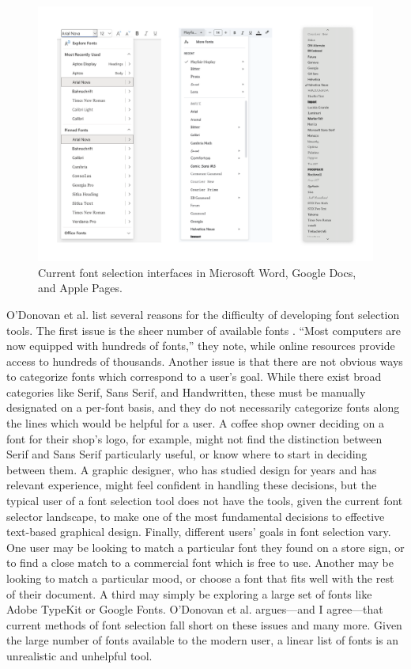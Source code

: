\begin{figure}[h]
    \centering
    \includegraphics[width=1\textwidth]{images/font-selectors.png}
    \caption{Current font selection interfaces in Microsoft Word, Google Docs, and Apple Pages.}
    \label{fig:font-selectors}
\end{figure}

O'Donovan et al. list several reasons for the difficulty of developing font selection tools. The first issue is the sheer number of available fonts \cite{odonovan2014}. ``Most computers are now equipped with hundreds of fonts,'' they note, while online resources provide access to hundreds of thousands. Another issue is that there are not obvious ways to categorize fonts which correspond to a user's goal. While there exist broad categories like Serif, Sans Serif, and Handwritten, these must be manually designated on a per-font basis, and they do not necessarily categorize fonts along the lines which would be helpful for a user. A coffee shop owner deciding on a font for their shop's logo, for example, might not find the distinction between Serif and Sans Serif particularly useful, or know where to start in deciding between them. A graphic designer, who has studied design for years and has relevant experience, might feel confident in handling these decisions, but the typical user of a font selection tool does not have the tools, given the current font selector landscape, to make one of the most fundamental decisions to effective text-based graphical design. Finally, different users' goals in font selection vary. One user may be looking to match a particular font they found on a store sign, or to find a close match to a commercial font which is free to use. Another may be looking to match a particular mood, or choose a font that fits well with the rest of their document. A third may simply be exploring a large set of fonts like Adobe TypeKit or Google Fonts. O'Donovan et al. argues—and I agree—that current methods of font selection fall short on these issues and many more. Given the large number of fonts available to the modern user, a linear list of fonts is an  unrealistic and unhelpful tool.

